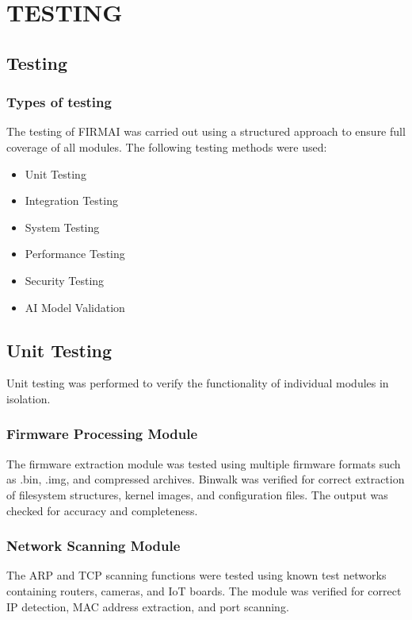 \chapter{TESTING}

\section{Testing}

\subsection{Types of testing}
The testing of FIRMAI was carried out using a structured approach to ensure full coverage of all modules. The following testing methods were used:
\begin{itemize}
	\item Unit Testing
	\item Integration Testing
	\item System Testing
	\item Performance Testing
	\item Security Testing
	\item AI Model Validation
\end{itemize}

\section{Unit Testing}
Unit testing was performed to verify the functionality of individual modules in isolation.

\subsection{Firmware Processing Module}
The firmware extraction module was tested using multiple firmware formats such as .bin, .img, and compressed archives. Binwalk was verified for correct extraction of filesystem structures, kernel images, and configuration files. The output was checked for accuracy and completeness.

\subsection{Network Scanning Module}
The ARP and TCP scanning functions were tested using known test networks containing routers, cameras, and IoT boards. The module was verified for correct IP detection, MAC address extraction, and port scanning.

